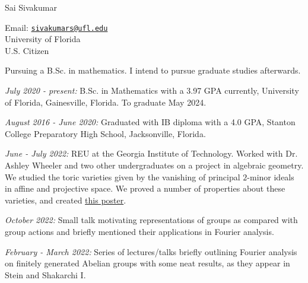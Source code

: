 \documentclass[11pt]{article}
\begin{document}
{\huge Sai Sivakumar}

Email: \href{mailto:sivakumars@ufl.edu}{\texttt{sivakumars@ufl.edu}}\\%
\hspace*{-1cm}University of Florida\\
\hspace*{-1cm}U.S. Citizen



Pursuing a B.Sc. in mathematics. I intend to pursue graduate studies afterwards.


\textsl{July 2020 - present:} B.Sc. in Mathematics with a 3.97 GPA currently, University of Florida, Gainesville, Florida. To graduate May 2024.

\textsl{August 2016 - June 2020:} Graduated with IB diploma with a 4.0 GPA, Stanton College Preparatory High School, Jacksonville, Florida.


\textsl{June - July 2022:} REU at the Georgia Institute of Technology. Worked with Dr. Ashley Wheeler and two other undergraduates on a project in algebraic geometry. We studied the toric varieties given by the vanishing of principal $2$-minor ideals in affine and projective space. We proved a number of properties about these varieties, and created {\color{blue}\href{https://math.gatech.edu/sites/default/files/images/boniface-rodriguez-sivakumar-wheeler.pdf}{this poster}}.


\textsl{October 2022:} Small talk motivating representations of groups as compared with group actions and briefly mentioned their applications in Fourier analysis. 

\textsl{February - March 2022:} Series of lectures/talks briefly outlining Fourier analysis on finitely generated Abelian groups with some neat results, as they appear in Stein and Shakarchi I. 
\end{document}
